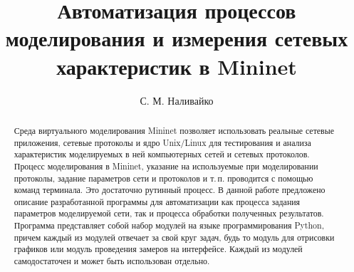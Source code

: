 \documentclass[60x84/16,8pt]{ittmm}
\begin{document}

\title{Автоматизация процессов моделирования и измерения сетевых характеристик в Mininet}

\author{С. М. Наливайко}

\address{Кафедра прикладной информатики и теории вероятностей\\
  Российский университет дружбы народов\\
  ул. Миклухо-Маклая, д.6, Москва, 117198, Россия}


\begin{abstract}
  Среда виртуального моделирования Mininet позволяет использовать
  реальные сетевые приложения, сетевые протоколы и ядро Unix/Linux для
  тестирования и анализа характеристик моделируемых в ней компьютерных
  сетей и сетевых протоколов. Процесс моделирования в Mininet,
  указание на используемые при моделировании протоколы, задание
  параметров сети и протоколов и т.\,п. проводится с помощью команд
  терминала. Это достаточно рутинный процесс. В данной работе
  предложено описание разработанной программы для автоматизации как
  процесса задания параметров моделируемой сети, так и процесса
  обработки полученных результатов. Программа представляет собой набор
  модулей на языке программирования Python, причем каждый из модулей
  отвечает за свой круг задач, будь то модуль для отрисовки графиков
  или модуль проведения замеров на интерфейсе. Каждый из модулей
  самодостаточен и может быть использован отдельно.
\end{abstract}






\end{document}
